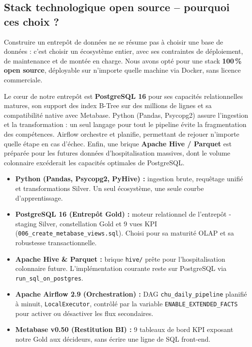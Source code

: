 \documentclass[12pt,a4paper]{report}
\begin{document}
\subsection{Stack technologique open source -- pourquoi ces choix ?}
Construire un entrepôt de données ne se résume pas à choisir une base de données : c'est choisir un écosystème entier, avec ses contraintes de déploiement, de maintenance et de montée en charge. Nous avons opté pour une stack \textbf{100\,\% open source}, déployable sur n'importe quelle machine via Docker, sans licence commerciale.

Le c\oe ur de notre entrepôt est \textbf{PostgreSQL 16} pour ses capacités relationnelles matures, son support des index B-Tree sur des millions de lignes et sa compatibilité native avec Metabase. Python (Pandas, Psycopg2) assure l'ingestion et la transformation : un seul langage pour tout le pipeline évite la fragmentation des compétences. Airflow orchestre et planifie, permettant de rejouer n'importe quelle étape en cas d'échec. Enfin, une brique \textbf{Apache Hive / Parquet} est préparée pour les futures données d'hospitalisation massives, dont le volume colonnaire excéderait les capacités optimales de PostgreSQL.

\begin{itemize}
    \item \textbf{Python (Pandas, Psycopg2, PyHive) :} ingestion brute, requêtage unifié et transformations Silver. Un seul écosystème, une seule courbe d'apprentissage.
    \item \textbf{PostgreSQL 16 (Entrepôt Gold) :} moteur relationnel de l'entrepôt - staging Silver, constellation Gold et 9 vues KPI (\texttt{006\_create\_metabase\allowbreak\_views.sql}). Choisi pour sa maturité OLAP et sa robustesse transactionnelle.
    \item \textbf{Apache Hive \& Parquet :} brique \texttt{hive/} prête pour l'hospitalisation colonnaire future. L'implémentation courante reste sur PostgreSQL via \texttt{run\_sql\_on\allowbreak\_postgres}.
    \item \textbf{Apache Airflow 2.9 (Orchestration) :} DAG \texttt{chu\_daily\_pipeline} planifié à minuit, \texttt{LocalExecutor}, contrôlé par la variable \texttt{ENABLE\_EXTENDED\_FACTS} pour activer ou désactiver les flux secondaires.
    \item \textbf{Metabase v0.50 (Restitution BI) :} 9 tableaux de bord KPI exposant notre Gold aux décideurs, sans écrire une ligne de SQL front-end.
\end{itemize}
\end{document}
